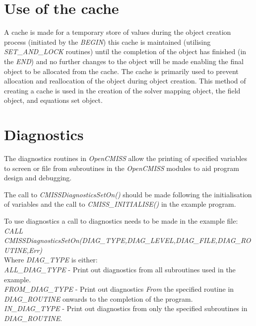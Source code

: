 \section{Use of the cache}
\label{sec:cache}

A cache is made for a temporary store of values during the object creation
process (initiated by the \emph{BEGIN}) this cache is maintained (utilising 
\emph{SET\_AND\_LOCK} routines) until the completion of the object has 
finished (in the \emph{END}) and no further changes to the object will be 
made enabling the final object to be allocated from the cache. The cache is 
primarily used to prevent allocation and reallocation of the object during 
object creation. This method of creating a cache is used in the creation of 
the solver mapping object, the field object, and equations set object.


\section{Diagnostics}
\label{sec:diagnostics}

The diagnostics routines in \emph{OpenCMISS} allow the printing of specified 
variables to screen or file from subroutines in the \emph{OpenCMISS} modules 
to aid program design and debugging.

The call to \emph{CMISSDiagnosticsSetOn()} should be made following the 
initialisation of variables and the call to \emph{CMISS\_INITIALISE()} in the
example program.

To use diagnostics a call to diagnostics needs to be made in the example file:
\\
\linebreak
\emph{CALL
CMISSDiagnosticsSetOn(DIAG\_TYPE,DIAG\_LEVEL,DIAG\_FILE,DIAG\_ROUTINE,Err)} \\ 
\linebreak
\noindent Where \emph{DIAG\_TYPE} is either: \\

\noindent \emph{ALL\_DIAG\_TYPE} - Print out diagnostics from all subroutines 
used in the example. \\
\emph{FROM\_DIAG\_TYPE} - Print out diagnostics \emph{From} the specified 
routine in \emph{DIAG\_ROUTINE} onwards to the completion of the program. \\
\emph{IN\_DIAG\_TYPE} - Print out diagnostics from only the specified 
subroutines in \emph{DIAG\_ROUTINE}. \\
\linebreak


